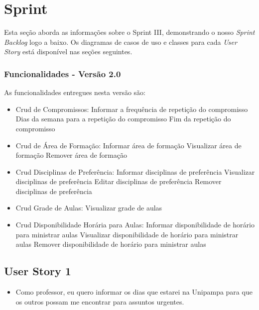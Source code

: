 \documentclass{abnt}
\begin{document}
\clearpage

\chapter{Sprint}
	
		Esta seção aborda as informações sobre o Sprint III, demonstrando o nosso \emph{Sprint Backlog} logo a baixo. Os diagramas de casos de uso e classes para cada \emph{User Story} está disponível nas seções seguintes.
	
			
		\subsection{Funcionalidades - Versão 2.0}
		
			As funcionalidades entregues nesta versão são:
		
			\begin{itemize} 
			\item Crud de Compromissos:
			\subitem Informar a frequência de repetição do compromisso
			\subitem Dias da semana para a repetição do compromisso
			\subitem Fim da repetição do compromisso
			
			\item Crud de Área de Formação:
			\subitem Informar área de formação
			\subitem Visualizar área de formação
			\subitem Remover área de formação
			
			\item Crud Disciplinas de Preferência:
			\subitem Informar disciplinas de preferência
			\subitem Visualizar disciplinas de preferência
			\subitem Editar disciplinas de preferência
			\subitem Remover disciplinas de preferência
			
			\item Crud Grade de Aulas:
			\subitem Visualizar grade de aulas
			
			\item Crud Disponibilidade Horária para Aulas:
			\subitem Informar disponibilidade de horário para ministrar aulas
			\subitem Visualizar disponibilidade de horário para ministrar aulas
			\subitem Remover disponibilidade de horário para ministrar aulas
			
			\end{itemize}
			
	\clearpage
	\section{User Story 1}
	
		\begin{itemize}
			\item Como professor, eu quero informar os dias que estarei na Unipampa para que os outros possam me encontrar para assuntos urgentes.
		\end{itemize}
		
\end{document}
